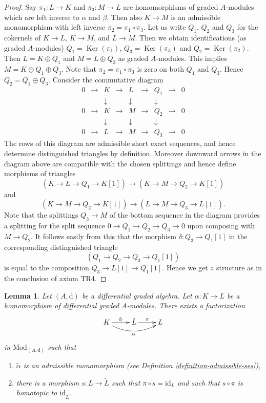 \documentclass{stacks-project}
\theoremstyle{plain}
\newtheorem{lemma}[subsection]{Lemma}
\theoremstyle{definition}
\theoremstyle{remark}
\numberwithin{equation}{subsection}
\def\Ker{\mathop{\mathrm{Ker}}}
\begin{document}
\begin{proof}
Say $\pi_1 : L \to K$ and $\pi_3 : M \to L$ are homomorphisms
of graded $A$-modules which are left inverse to $\alpha$ and $\beta$.
Then also $K \to M$ is an admissible monomorphism with left
inverse $\pi_2 = \pi_1 \circ \pi_3$. Let us write $Q_1$, $Q_2$
and $Q_3$ for the cokernels of $K \to L$, $K \to M$, and $L \to M$.
Then we obtain identifications (as graded $A$-modules)
$Q_1 = \Ker(\pi_1)$, $Q_3 = \Ker(\pi_3)$ and
$Q_2 = \Ker(\pi_2)$. Then $L = K \oplus Q_1$ and
$M = L \oplus Q_3$ as graded $A$-modules. This implies
$M = K \oplus Q_1 \oplus Q_3$. Note that $\pi_2 = \pi_1 \circ \pi_3$
is zero on both $Q_1$ and $Q_3$. Hence $Q_2 = Q_1 \oplus Q_3$.
Consider the commutative diagram
$$
\begin{matrix}
0 & \to & K & \to & L & \to & Q_1 & \to & 0 \\
  &     & \downarrow &     & \downarrow &     & \downarrow  & \\
0 & \to & K & \to & M & \to & Q_2 & \to & 0 \\
  &     & \downarrow &     & \downarrow &     & \downarrow  & \\
0 & \to & L & \to & M & \to & Q_3 & \to & 0
\end{matrix}
$$
The rows of this diagram are admissible short exact sequences, and
hence determine distinguished triangles by definition. Moreover
downward arrows in the diagram above are compatible with the chosen
splittings and hence define morphisms of triangles
$$
(K \to L \to Q_1 \to K[1])
\longrightarrow
(K \to M \to Q_2 \to K[1])
$$
and
$$
(K \to M \to Q_2 \to K[1])
\longrightarrow
(L \to M \to Q_3 \to L[1]).
$$
Note that the splittings $Q_3 \to M$ of the bottom sequence in the
diagram provides a splitting for the split sequence
$0 \to Q_1 \to Q_2 \to Q_3 \to 0$ upon composing with $M \to Q_2$.
It follows easily from this that the morphism $\delta : Q_3 \to Q_1[1]$
in the corresponding distinguished triangle
$$
(Q_1 \to Q_2 \to Q_3 \to Q_1[1])
$$
is equal to the composition $Q_3 \to L[1] \to Q_1[1]$.
Hence we get a structure as in the conclusion of axiom TR4.
\end{proof}

\begin{lemma}
\label{lemma-make-injective}
Let $(A, \text{d})$ be a differential graded algebra.
Let $\alpha : K \to L$ be a homomorphism of differential graded
$A$-modules. There exists a factorization
$$
\xymatrix{
K \ar[r]^{\tilde \alpha} \ar@/_1pc/[rr]_\alpha &
\tilde L \ar[r]^\pi & L
}
$$
in $\text{Mod}_{(A, \text{d})}$ such that
\begin{enumerate}
\item $\tilde \alpha$ is an admissible monomorphism (see
Definition \ref{definition-admissible-ses}),
\item there is a morphism $s : L \to \tilde L$
such that $\pi \circ s = \text{id}_L$ and such that
$s \circ \pi$ is homotopic to $\text{id}_{\tilde L}$.
\end{enumerate}
\end{lemma}
\end{document}

